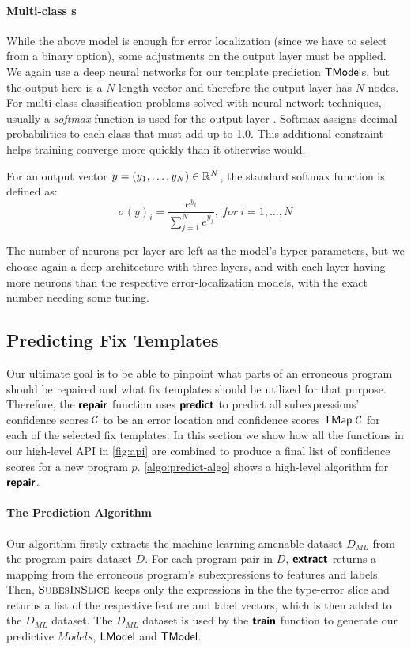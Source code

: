 \paragraph{Multi-class \dnn{}s}
While the above model is enough for error localization (since we have to select
from a binary option), some adjustments on the output layer must be applied. We
again use a deep neural networks for our template prediction $\mathsf{TModel}$s, but the
output here is a $N$-length vector and therefore the output layer has $N$ nodes.
For multi-class classification problems solved with neural network techniques,
usually a \emph{softmax} function is used for the output layer
\citep{Goodfellow-et-al-2016, Bishop-book-2006}. Softmax assigns decimal
probabilities to each class that must add up to 1.0. This additional constraint
helps training converge more quickly than it otherwise would.

For an output vector $y = (y_1, \dots, y_N) \in \mathbb{R}^{N}$, the standard softmax
function is defined as:
\[ \sigma(y)_i = \frac{e^{y_i}}{\sum_{j=1}^{N} e^{y_j}},\ for\ i = 1, \dots, N \]

The number of neurons per layer are left as the model's hyper-parameters, but we
choose again a deep architecture with three layers, and with each layer having
more neurons than the respective error-localization models, with the exact
number needing some tuning.



\subsection{Predicting Fix Templates}
\label{subsec:predict}

Our ultimate goal is to be able to pinpoint what parts of an erroneous program
should be repaired and what fix templates should be utilized for that purpose.
Therefore, the $\bm{\mathsf{repair}}$ function uses $\bm{\mathsf{predict}}$ to predict all
subexpressions' confidence scores $\mathcal{C}$ to be an error location and confidence
scores $\mathsf{TMap}\ \mathcal{C}$ for each of the selected fix templates. In this section we
show how all the functions in our high-level API in \autoref{fig:api} are
combined to produce a final list of confidence scores for a new program $p$.
\autoref{algo:predict-algo} shows a high-level algorithm for $\bm{\mathsf{repair}}$.

\paragraph{The Prediction Algorithm}
Our algorithm firstly extracts the machine-learning-amenable dataset $D_{ML}$
from the program pairs dataset $D$. For each program pair in $D$, $\bm{\mathsf{extract}}$
returns a mapping from the erroneous program's subexpressions to features and
labels. Then, $\textsc{SubesInSlice}$ keeps only the expressions in the the
type-error slice and returns a list of the respective feature and label vectors,
which is then added to the $D_{ML}$ dataset. The $D_{ML}$ dataset is used by the
$\bm{\mathsf{train}}$ function to generate our predictive $Models$, \ie $\mathsf{LModel}$ and
$\mathsf{TModel}$.

